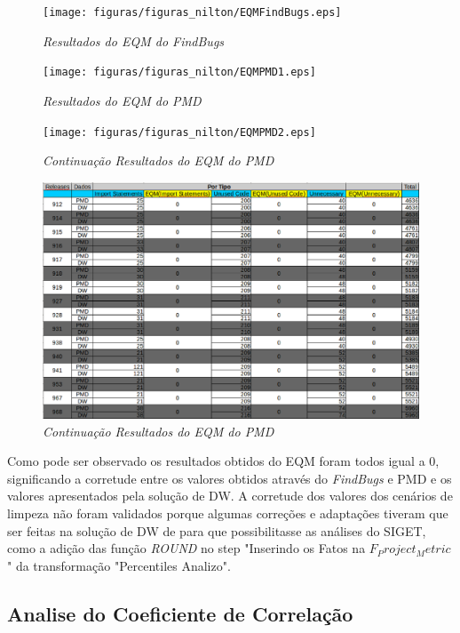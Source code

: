 \begin{figure}[h!]
\centering
\texttt{[image: figuras/figuras\_nilton/EQMFindBugs.eps]}
\caption{\textit{Resultados do EQM do FindBugs}}
\label{EQMFindBugs}
\end{figure}

\begin{figure}[h!]
\centering
\texttt{[image: figuras/figuras\_nilton/EQMPMD1.eps]}
\caption{\textit{Resultados do EQM do PMD}}
\label{EQMPMD1}
\end{figure}

\begin{figure}[h!]
\centering
\texttt{[image: figuras/figuras\_nilton/EQMPMD2.eps]}
\caption{\textit{Continuação Resultados do EQM do PMD}}
\label{EQMPMD2}
\end{figure}

\begin{figure}[h!]
\centering
\includegraphics[keepaspectratio=false,scale=0.45,angle=90]{figuras/figuras_nilton/EQMPMD3.eps}
\caption{\textit{Continuação Resultados do EQM do PMD}}
\label{EQMPMD3}
\end{figure}

Como pode ser observado os resultados obtidos do EQM foram todos igual a 0, significando a corretude entre os valores obtidos através do \textit{FindBugs} e PMD e os valores apresentados pela solução de DW. A corretude dos valores dos cenários de limpeza não foram validados porque algumas correções e adaptações tiveram que ser feitas na solução de DW de \cite{rego_monitoramento_2014} para que possibilitasse as análises do SIGET, como a adição das função \textit{ROUND} no step "Inserindo os Fatos na $F_Project_Metric $" da transformação "Percentiles Analizo".  


\subsection{Analise do Coeficiente de Correlação}

